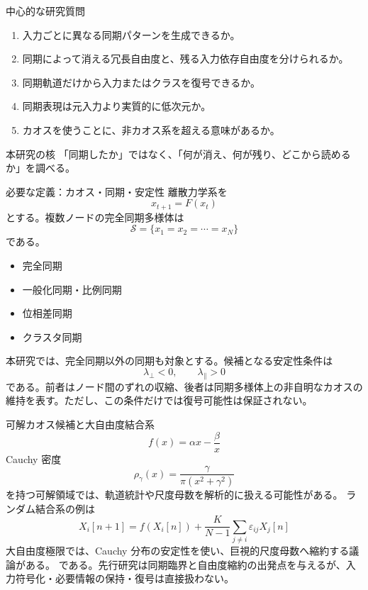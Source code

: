 \documentclass[aspectratio=169,11pt]{beamer}
\newcommand{\lperp}{\lambda_{\perp}}
\newcommand{\lpara}{\lambda_{\parallel}}
\begin{document}
\begin{frame}{中心的な研究質問}
  \begin{enumerate}
    \item 入力ごとに異なる同期パターンを生成できるか。
    \item 同期によって消える冗長自由度と、残る入力依存自由度を分けられるか。
    \item 同期軌道だけから入力またはクラスを復号できるか。
    \item 同期表現は元入力より実質的に低次元か。
    \item カオスを使うことに、非カオス系を超える意味があるか。
  \end{enumerate}
  \vfill
  \begin{alertblock}{本研究の核}
    「同期したか」ではなく、「何が消え、何が残り、どこから読めるか」を調べる。
  \end{alertblock}
\end{frame}

\begin{frame}{必要な定義：カオス・同期・安定性}
  離散力学系を
  \[
    x_{t+1}=F(x_t)
  \]
  とする。複数ノードの完全同期多様体は
  \[
    \mathcal S=\{x_1=x_2=\cdots=x_N\}
  \]
  である。
  \begin{itemize}
    \item 完全同期
    \item 一般化同期・比例同期
    \item 位相差同期
    \item クラスタ同期
  \end{itemize}
  本研究では、完全同期以外の同期も対象とする。候補となる安定性条件は
  \[
    \boxed{\lperp<0,\qquad \lpara>0}
  \]
  である。前者はノード間のずれの収縮、後者は同期多様体上の非自明なカオスの維持を表す。ただし、この条件だけでは復号可能性は保証されない。
\end{frame}

\begin{frame}{可解カオス候補と大自由度結合系}
  \[
    f(x)=\alpha x-\frac{\beta}{x}
  \]
  Cauchy 密度
  \[
    \rho_\gamma(x)=\frac{\gamma}{\pi(x^2+\gamma^2)}
  \]
  を持つ可解領域では、軌道統計や尺度母数を解析的に扱える可能性がある。
  ランダム結合系の例は
  \[
    X_i[n+1]
    =f(X_i[n])
    +\frac{K}{N-1}\sum_{j\ne i}\varepsilon_{ij}X_j[n]
  \]
  大自由度極限では、Cauchy 分布の安定性を使い、巨視的尺度母数へ縮約する議論がある。
  である。先行研究は同期臨界と自由度縮約の出発点を与えるが、入力符号化・必要情報の保持・復号は直接扱わない。
\end{frame}
\end{document}
